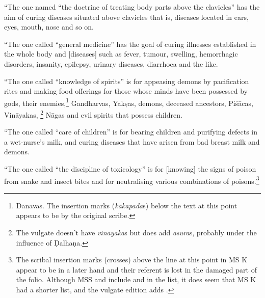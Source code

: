 \begin{translation}
    \item[8.2] 
    
“The one named “the doctrine of treating body parts above the
clavicles” has the aim of curing diseases situated above clavicles
that is, diseases located in ears, eyes, mouth, nose and so on.
    
    \item[8.3] 
    
“The one called “general medicine” has the goal of curing
illnesses established in the whole body and [diseases] such as fever,
tumour, swelling, hemorrhagic disorders, insanity, epilepsy, urinary
diseases, diarrhoea and the like.
    
    \item[8.4] 
    
“The one called “knowledge of spirits” is for
appeasing demons by pacification rites and making food offerings
for those whose minds have been possessed by gods, their
enemies,\footnote{Dānavas.  The insertion marks
    (\emph{kākapada}s) below the text at this point appears to be by
    the original scribe.} Gandharvas, Yakṣas, demons, deceased
    ancestors, Piśācas, Vināyakas, \footnote{The vulgate doesn't have
        \emph{vināyaka}s but does add \emph{asura}s, probably under the
        influence of Ḍalhaṇa.}
        Nāgas and evil spirits that possess children. %
    
    
    \item[8.5] 
    
“The one called “care of children” is for bearing children and
purifying defects in a wet-nurse's milk, and curing diseases that
have arisen from bad breast milk and demons.
    
    \item[8.6] 
    
“The one called “the discipline of toxicology” is for
    [knowing] the signs of poison from snake and insect bites and for
    neutralising various combinations of poisons.\footnote{The scribal
    insertion marks (crosses) above the line at this point in MS K appear to
    be in a later hand and their referent is lost in the damaged part of the
    folio.  Although MSS  and  include  and
     in the list, it does seem that MS K had
    a shorter list, and the vulgate edition adds .}
    

\end{translation}
